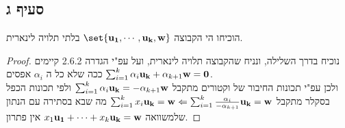 \documentclass{article}
\DeclarePairedDelimiter\set\{\}
\begin{document}
\subsection*{סעיף ג}
הוכיחו הי הקבוצה $\set{\bld{u_1}, \cdots, \bld{u_k}, \bld{w}}$ בלתי תלויה לינארית.
\begin{proof}
	נוכיח בדרך השלילה,
	ונניח שהקבוצה תלויה לינארית, ועל עפ"י הגדרה 2.6.2 קיימים
	$\sum_{i=1}^{k}{\alpha_i\mathbf{u_k}} + \alpha_{k+1}\mathbf{w} = \mathbf{0}$
	ככה שלא כל ה $\alpha_i$ אפסים. \\
	ולכן עפ"י תכונות החיבור של וקטורים מתקבל $\sum_{i=1}^{k}{\alpha_i\mathbf{u_k}} = -\alpha_{k+1}\mathbf{w}$
	ולפי תכונות הכפל בסקלר מתקבל
	$\sum_{i=1}^{k}{x_i\mathbf{u_k}} = \mathbf{w} \Leftarrow \sum_{i=1}^{k}{\frac{\alpha_i}{-\alpha_{k+1}}\mathbf{u_k}} = \mathbf{w}$
	מה שבא בסתירה עם הנתון שלמשוואה $x_1\mathbf{u_1} + \cdots + x_k\mathbf{u_k}=\mathbf{w}$ אין פתרון.
\end{proof}
\end{document}
